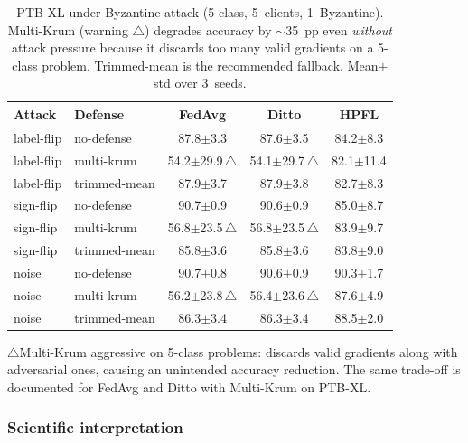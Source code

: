 \documentclass[conference]{IEEEtran}
\begin{document}
\begin{table}[htbp]
\centering
\caption{PTB-XL under Byzantine attack (5-class, 5~clients, 1~Byzantine). Multi-Krum (warning $\triangle$) degrades accuracy by $\sim$35~pp even \emph{without} attack pressure because it discards too many valid gradients on a 5-class problem. Trimmed-mean is the recommended fallback. Mean$\pm$std over 3~seeds.}
\label{tab:tier_b_byz_ptb}
\small
\setlength{\tabcolsep}{4pt}
\begin{tabular}{llccc}
\toprule
\textbf{Attack} & \textbf{Defense} & \textbf{FedAvg} & \textbf{Ditto} & \textbf{HPFL} \\
\midrule
label-flip & no-defense & 87.8$\pm$3.3 & 87.6$\pm$3.5 & 84.2$\pm$8.3 \\
label-flip & multi-krum & 54.2$\pm$29.9\,$\triangle$ & 54.1$\pm$29.7\,$\triangle$ & 82.1$\pm$11.4 \\
label-flip & trimmed-mean & 87.9$\pm$3.7 & 87.9$\pm$3.8 & 82.7$\pm$8.3 \\
sign-flip & no-defense & 90.7$\pm$0.9 & 90.6$\pm$0.9 & 85.0$\pm$8.7 \\
sign-flip & multi-krum & 56.8$\pm$23.5\,$\triangle$ & 56.8$\pm$23.5\,$\triangle$ & 83.9$\pm$9.7 \\
sign-flip & trimmed-mean & 85.8$\pm$3.6 & 85.8$\pm$3.6 & 83.8$\pm$9.0 \\
noise & no-defense & 90.7$\pm$0.8 & 90.6$\pm$0.9 & 90.3$\pm$1.7 \\
noise & multi-krum & 56.2$\pm$23.8\,$\triangle$ & 56.4$\pm$23.6\,$\triangle$ & 87.6$\pm$4.9 \\
noise & trimmed-mean & 86.3$\pm$3.4 & 86.3$\pm$3.4 & 88.5$\pm$2.0 \\
\bottomrule
\end{tabular}

\vspace{1mm}
\footnotesize{$\triangle$Multi-Krum aggressive on 5-class problems: discards valid gradients along with adversarial ones, causing an unintended accuracy reduction. The same trade-off is documented for FedAvg and Ditto with Multi-Krum on PTB-XL.}
\end{table}

\subsubsection*{Scientific interpretation}
\end{document}
